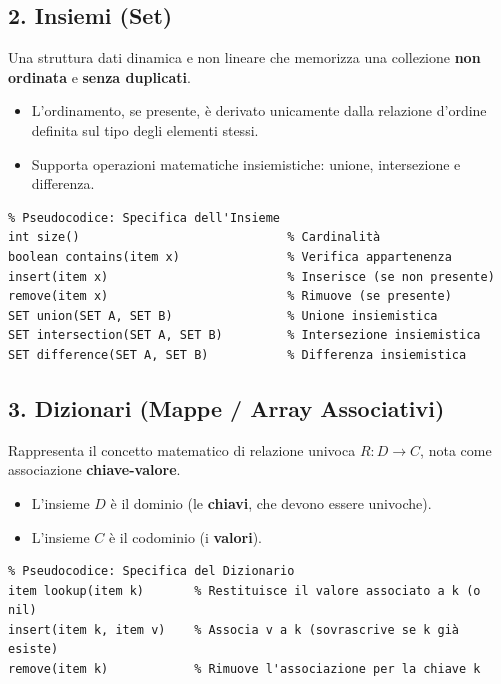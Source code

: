 \documentclass[12pt, a4paper]{article}
\begin{document}
\subsection{2. Insiemi (Set)}
Una struttura dati dinamica e non lineare che memorizza una collezione \textbf{non ordinata} e \textbf{senza duplicati}.
\begin{itemize}
\item L'ordinamento, se presente, è derivato unicamente dalla relazione d'ordine definita sul tipo degli elementi stessi.
\item Supporta operazioni matematiche insiemistiche: unione, intersezione e differenza.
\end{itemize}

\begin{verbatim}
% Pseudocodice: Specifica dell'Insieme
int size()                             % Cardinalità
boolean contains(item x)               % Verifica appartenenza
insert(item x)                         % Inserisce (se non presente)
remove(item x)                         % Rimuove (se presente)
SET union(SET A, SET B)                % Unione insiemistica
SET intersection(SET A, SET B)         % Intersezione insiemistica
SET difference(SET A, SET B)           % Differenza insiemistica
\end{verbatim}

\subsection{3. Dizionari (Mappe / Array Associativi)}
Rappresenta il concetto matematico di relazione univoca $R: D \rightarrow C$, nota come associazione \textbf{chiave-valore}.
\begin{itemize}
\item L'insieme $D$ è il dominio (le \textbf{chiavi}, che devono essere univoche).
\item L'insieme $C$ è il codominio (i \textbf{valori}).
\end{itemize}

\begin{verbatim}
% Pseudocodice: Specifica del Dizionario
item lookup(item k)       % Restituisce il valore associato a k (o nil)
insert(item k, item v)    % Associa v a k (sovrascrive se k già esiste)
remove(item k)            % Rimuove l'associazione per la chiave k
\end{verbatim}
\end{document}
